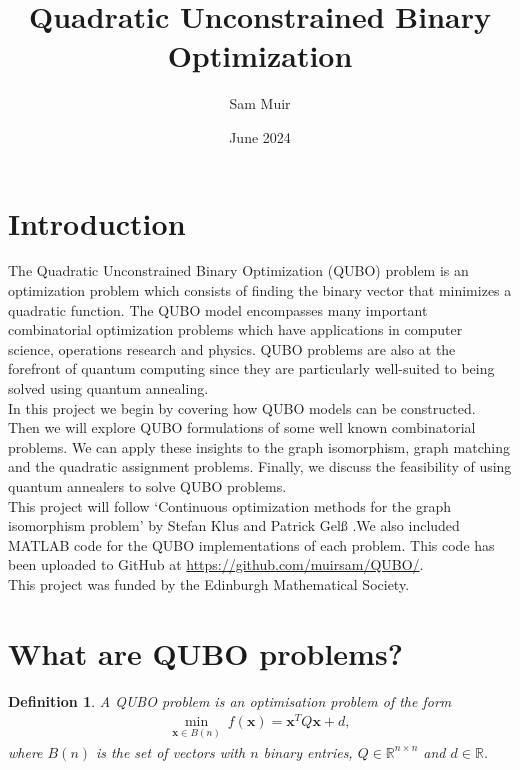 \documentclass{article}
\title{Quadratic Unconstrained Binary Optimization}
\author{Sam Muir }
\date{June 2024}
\newtheorem{defn}[prop]{Definition}
\begin{document}
\maketitle

\section{Introduction}

The Quadratic Unconstrained Binary Optimization (QUBO) problem is an optimization problem which consists of finding the binary vector that minimizes a quadratic function.
The QUBO model encompasses many important combinatorial optimization problems which have applications in computer science, operations research and physics. QUBO problems are also at the forefront of quantum computing since they are particularly well-suited to being solved using quantum annealing.\\

\noindent In this project we begin by covering how QUBO models can be constructed. Then we will explore QUBO formulations of some well known combinatorial problems. We can apply these insights to the graph isomorphism, graph matching and the quadratic assignment problems. Finally, we discuss the feasibility of using quantum annealers to solve QUBO problems. \\

\noindent This project will follow `Continuous optimization methods for the graph isomorphism problem' by Stefan Klus and Patrick Gelß \cite{klus2023continuous}.We also included MATLAB code for the QUBO implementations of each problem. This code has been uploaded to GitHub at \href{https://github.com/muirsam/QUBO/}{https://github.com/muirsam/QUBO/}.\\

\noindent This project was funded by the Edinburgh Mathematical Society.

\section{What are QUBO problems?}
\begin{defn}
A QUBO problem is an optimisation problem of the form
\begin{align*}
    \min_{\mathbf{x} \in B(n)} \: f(\mathbf{x}) = \mathbf{x}^T Q \mathbf{x} + d,
\end{align*}
where \(B(n)\) is the set of vectors with \(n\) binary entries, \(Q \in \mathbb{R}^{n \times n}\) and \(d \in \mathbb{R}\).
\end{defn}
\end{document}
